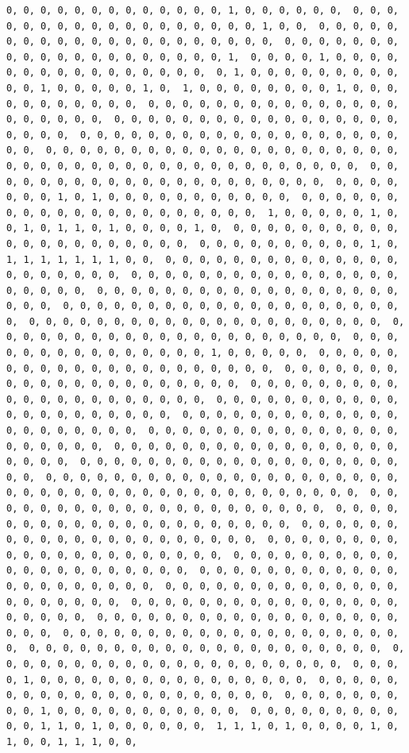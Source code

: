 \documentclass[
]{article}
\begin{document}
\begin{verbatim}
0, 0, 0, 0, 0, 0, 0, 0, 0, 0, 0, 0, 0, 1, 0, 0, 0, 0, 0, 0,  0, 0, 0, 0, 0, 0, 0, 0, 0, 0, 0, 0, 0, 0, 0, 0, 0, 0, 1, 0, 0,  0, 0, 0, 0, 0, 0, 0, 0, 0, 0, 0, 0, 0, 0, 0, 0, 0, 0, 0, 0, 0,  0, 0, 0, 0, 0, 0, 0, 0, 0, 0, 0, 0, 0, 0, 0, 0, 0, 0, 0, 0, 1,  0, 0, 0, 0, 1, 0, 0, 0, 0, 0, 0, 0, 0, 0, 0, 0, 0, 0, 0, 0, 0,  0, 1, 0, 0, 0, 0, 0, 0, 0, 0, 0, 0, 0, 1, 0, 0, 0, 0, 0, 1, 0,  1, 0, 0, 0, 0, 0, 0, 0, 0, 1, 0, 0, 0, 0, 0, 0, 0, 0, 0, 0, 0,  0, 0, 0, 0, 0, 0, 0, 0, 0, 0, 0, 0, 0, 0, 0, 0, 0, 0, 0, 0, 0,  0, 0, 0, 0, 0, 0, 0, 0, 0, 0, 0, 0, 0, 0, 0, 0, 0, 0, 0, 0, 0,  0, 0, 0, 0, 0, 0, 0, 0, 0, 0, 0, 0, 0, 0, 0, 0, 0, 0, 0, 0, 0,  0, 0, 0, 0, 0, 0, 0, 0, 0, 0, 0, 0, 0, 0, 0, 0, 0, 0, 0, 0, 0,  0, 0, 0, 0, 0, 0, 0, 0, 0, 0, 0, 0, 0, 0, 0, 0, 0, 0, 0, 0, 0,  0, 0, 0, 0, 0, 0, 0, 0, 0, 0, 0, 0, 0, 0, 0, 0, 0, 0, 0, 0, 0,  0, 0, 0, 0, 0, 0, 0, 1, 0, 1, 0, 0, 0, 0, 0, 0, 0, 0, 0, 0, 0,  0, 0, 0, 0, 0, 0, 0, 0, 0, 0, 0, 0, 0, 0, 0, 0, 0, 0, 0, 0, 0,  1, 0, 0, 0, 0, 0, 1, 0, 0, 1, 0, 1, 1, 0, 1, 0, 0, 0, 0, 1, 0,  0, 0, 0, 0, 0, 0, 0, 0, 0, 0, 0, 0, 0, 0, 0, 0, 0, 0, 0, 0, 0,  0, 0, 0, 0, 0, 0, 0, 0, 0, 0, 1, 0, 1, 1, 1, 1, 1, 1, 1, 0, 0,  0, 0, 0, 0, 0, 0, 0, 0, 0, 0, 0, 0, 0, 0, 0, 0, 0, 0, 0, 0, 0,  0, 0, 0, 0, 0, 0, 0, 0, 0, 0, 0, 0, 0, 0, 0, 0, 0, 0, 0, 0, 0,  0, 0, 0, 0, 0, 0, 0, 0, 0, 0, 0, 0, 0, 0, 0, 0, 0, 0, 0, 0, 0,  0, 0, 0, 0, 0, 0, 0, 0, 0, 0, 0, 0, 0, 0, 0, 0, 0, 0, 0, 0, 0,  0, 0, 0, 0, 0, 0, 0, 0, 0, 0, 0, 0, 0, 0, 0, 0, 0, 0, 0, 0, 0,  0, 0, 0, 0, 0, 0, 0, 0, 0, 0, 0, 0, 0, 0, 0, 0, 0, 0, 0, 0, 0,  0, 0, 0, 0, 0, 0, 0, 0, 0, 0, 0, 0, 0, 0, 0, 1, 0, 0, 0, 0, 0,  0, 0, 0, 0, 0, 0, 0, 0, 0, 0, 0, 0, 0, 0, 0, 0, 0, 0, 0, 0, 0,  0, 0, 0, 0, 0, 0, 0, 0, 0, 0, 0, 0, 0, 0, 0, 0, 0, 0, 0, 0, 0,  0, 0, 0, 0, 0, 0, 0, 0, 0, 0, 0, 0, 0, 0, 0, 0, 0, 0, 0, 0, 0,  0, 0, 0, 0, 0, 0, 0, 0, 0, 0, 0, 0, 0, 0, 0, 0, 0, 0, 0, 0, 0,  0, 0, 0, 0, 0, 0, 0, 0, 0, 0, 0, 0, 0, 0, 0, 0, 0, 0, 0, 0, 0,  0, 0, 0, 0, 0, 0, 0, 0, 0, 0, 0, 0, 0, 0, 0, 0, 0, 0, 0, 0, 0,  0, 0, 0, 0, 0, 0, 0, 0, 0, 0, 0, 0, 0, 0, 0, 0, 0, 0, 0, 0, 0,  0, 0, 0, 0, 0, 0, 0, 0, 0, 0, 0, 0, 0, 0, 0, 0, 0, 0, 0, 0, 0,  0, 0, 0, 0, 0, 0, 0, 0, 0, 0, 0, 0, 0, 0, 0, 0, 0, 0, 0, 0, 0,  0, 0, 0, 0, 0, 0, 0, 0, 0, 0, 0, 0, 0, 0, 0, 0, 0, 0, 0, 0, 0,  0, 0, 0, 0, 0, 0, 0, 0, 0, 0, 0, 0, 0, 0, 0, 0, 0, 0, 0, 0, 0,  0, 0, 0, 0, 0, 0, 0, 0, 0, 0, 0, 0, 0, 0, 0, 0, 0, 0, 0, 0, 0,  0, 0, 0, 0, 0, 0, 0, 0, 0, 0, 0, 0, 0, 0, 0, 0, 0, 0, 0, 0, 0,  0, 0, 0, 0, 0, 0, 0, 0, 0, 0, 0, 0, 0, 0, 0, 0, 0, 0, 0, 0, 0,  0, 0, 0, 0, 0, 0, 0, 0, 0, 0, 0, 0, 0, 0, 0, 0, 0, 0, 0, 0, 0,  0, 0, 0, 0, 0, 0, 0, 0, 0, 0, 0, 0, 0, 0, 0, 0, 0, 0, 0, 0, 0,  0, 0, 0, 0, 0, 0, 0, 0, 0, 0, 0, 0, 0, 0, 0, 0, 0, 0, 0, 0, 0,  0, 0, 0, 0, 0, 0, 0, 0, 0, 0, 0, 0, 0, 0, 0, 0, 0, 0, 0, 0, 0,  0, 0, 0, 0, 0, 0, 0, 0, 0, 0, 0, 0, 0, 0, 0, 0, 0, 0, 0, 0, 0,  0, 0, 0, 0, 0, 0, 0, 0, 0, 0, 0, 0, 0, 0, 0, 0, 0, 0, 0, 0, 0,  0, 0, 0, 0, 0, 0, 0, 0, 0, 0, 0, 0, 0, 0, 0, 0, 0, 0, 0, 0, 0,  0, 0, 0, 0, 0, 0, 0, 0, 0, 0, 0, 0, 0, 0, 0, 0, 0, 0, 0, 0, 0,  0, 0, 0, 0, 1, 0, 0, 0, 0, 0, 0, 0, 0, 0, 0, 0, 0, 0, 0, 0, 0,  0, 0, 0, 0, 0, 0, 0, 0, 0, 0, 0, 0, 0, 0, 0, 0, 0, 0, 0, 0, 0,  0, 0, 0, 0, 0, 0, 0, 0, 0, 1, 0, 0, 0, 0, 0, 0, 0, 0, 0, 0, 0,  0, 0, 0, 0, 0, 0, 0, 0, 0, 0, 0, 1, 1, 0, 1, 0, 0, 0, 0, 0, 0,  1, 1, 1, 0, 1, 0, 0, 0, 0, 1, 0, 1, 0, 0, 1, 1, 1, 0, 0, 
\end{verbatim}
\end{document}
